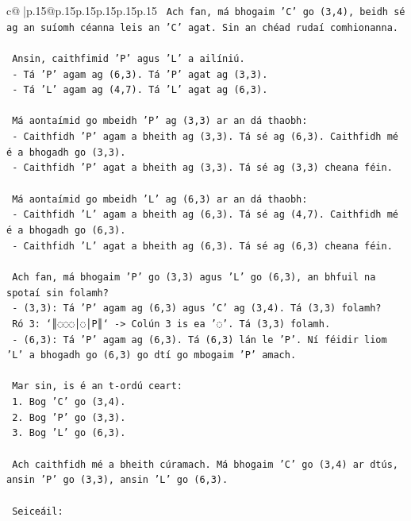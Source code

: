\documentclass{article}
\begin{document}
{\begin{supertabular}{c@{$\;$}|p{.15\linewidth}@{}p{.15\linewidth}p{.15\linewidth}p{.15\linewidth}p{.15\linewidth}p{.15\linewidth}}
{{{\texttt{   Ach fan, má bhogaim 'C' go (3,4), beidh sé ag an suíomh céanna leis an 'C' agat. Sin an chéad rudaí comhionanna.} \\
\\ 
\texttt{   Ansin, caithfimid 'P' agus 'L' a ailíniú.} \\
\texttt{   {-} Tá 'P' agam ag (6,3). Tá 'P' agat ag (3,3).} \\
\texttt{   {-} Tá 'L' agam ag (4,7). Tá 'L' agat ag (6,3).} \\
\\ 
\texttt{   Má aontaímid go mbeidh 'P' ag (3,3) ar an dá thaobh:} \\
\texttt{   {-} Caithfidh 'P' agam a bheith ag (3,3). Tá sé ag (6,3). Caithfidh mé é a bhogadh go (3,3).} \\
\texttt{   {-} Caithfidh 'P' agat a bheith ag (3,3). Tá sé ag (3,3) cheana féin.} \\
\\ 
\texttt{   Má aontaímid go mbeidh 'L' ag (6,3) ar an dá thaobh:} \\
\texttt{   {-} Caithfidh 'L' agam a bheith ag (6,3). Tá sé ag (4,7). Caithfidh mé é a bhogadh go (6,3).} \\
\texttt{   {-} Caithfidh 'L' agat a bheith ag (6,3). Tá sé ag (6,3) cheana féin.} \\
\\ 
\texttt{   Ach fan, má bhogaim 'P' go (3,3) agus 'L' go (6,3), an bhfuil na spotaí sin folamh?} \\
\texttt{   {-} (3,3): Tá 'P' agam ag (6,3) agus 'C' ag (3,4). Tá (3,3) folamh?} \\
\texttt{     Ró 3: `║◌◌◌│◌│P║` {-}> Colún 3 is ea '◌'. Tá (3,3) folamh.} \\
\texttt{   {-} (6,3): Tá 'P' agam ag (6,3). Tá (6,3) lán le 'P'. Ní féidir liom 'L' a bhogadh go (6,3) go dtí go mbogaim 'P' amach.} \\
\\ 
\texttt{   Mar sin, is é an t{-}ordú ceart:} \\
\texttt{   1. Bog 'C' go (3,4).} \\
\texttt{   2. Bog 'P' go (3,3).} \\
\texttt{   3. Bog 'L' go (6,3).} \\
\\ 
\texttt{   Ach caithfidh mé a bheith cúramach. Má bhogaim 'C' go (3,4) ar dtús, ansin 'P' go (3,3), ansin 'L' go (6,3).} \\
\\ 
\texttt{   Seiceáil:} \\
}}}
\end{supertabular}}
\end{document}
